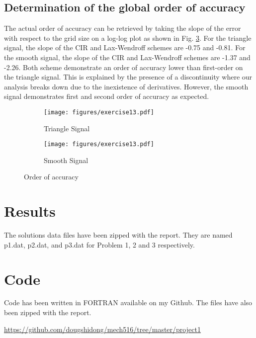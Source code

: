 \documentclass[letterpaper,12pt,]{article}
\begin{document}
\subsection{Determination of the global order of accuracy}

The actual order of accuracy can be retrieved by taking the slope of the error with respect to the grid size on a log-log plot as shown in Fig. \ref{fig:e13}.
For the triangle signal, the slope of the CIR and Lax-Wendroff schemes are -0.75 and -0.81.
For the smooth signal, the slope of the CIR and Lax-Wendroff schemes are -1.37 and -2.26.
Both scheme demonstrate an order of accuracy lower than first-order on the triangle signal.
This is explained by the presence of a discontinuity where our analysis breaks down due to the inexistence of derivatives.
However, the smooth signal demonstrates first and second order of accuracy as expected.

\begin{figure}[htb]%
  \centering%
  \begin{subfigure}[b]{0.49\textwidth}
    \texttt{[image: figures/exercise13.pdf]}
    \caption{Triangle Signal}
    \label{fig:es}
  \end{subfigure}
  \begin{subfigure}[b]{0.49\textwidth}
    \texttt{[image: figures/exercise13.pdf]}
    \caption{Smooth Signal}
    \label{fig:et}
  \end{subfigure}
\caption{Order of accuracy}
\label{fig:e13}
\end{figure}


\section*{Results}

The solutions data files have been zipped with the report. They are named p1.dat, p2.dat, and p3.dat for Problem 1, 2 and 3 respectively.

\section*{Code}

Code has been written in FORTRAN available on my Github.
The files have also been zipped with the report.

\url{https://github.com/dougshidong/mech516/tree/master/project1}
\end{document}
